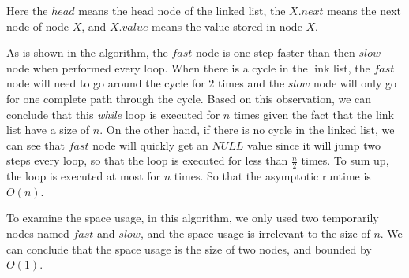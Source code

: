 \documentclass[11pt]{article}
\begin{document}
	Here the $head$ means the head node of the linked list, the $X.next$ means the next node of node $X$, and $X.value$ means the value stored in node $X$.
	
	As is shown in the algorithm, the $fast$ node is one step faster than then $slow$ node when performed every loop. When there is a cycle in the link list, the $fast$ node will need to go around the cycle for $2$ times and the $slow$ node will only go for one complete path through the cycle. Based on this observation, we can conclude that this \emph{while} loop is executed for $n$ times given the fact that the link list have a size of $n$. On the other hand, if there is no cycle in the linked list, we can see that $fast$ node will quickly get an $NULL$ value since it will jump two steps every loop, so that the loop is executed for less than $\frac{n}{2}$ times. To sum up, the loop is executed at most for $n$ times. So that the asymptotic runtime is $O(n)$. 
	
	To examine the space usage, in this algorithm, we only used two temporarily nodes named $fast$ and $slow$, and the space usage is irrelevant to the size of $n$. We can conclude that the space usage is the size of two nodes, and bounded by $O(1)$.
\end{document}
